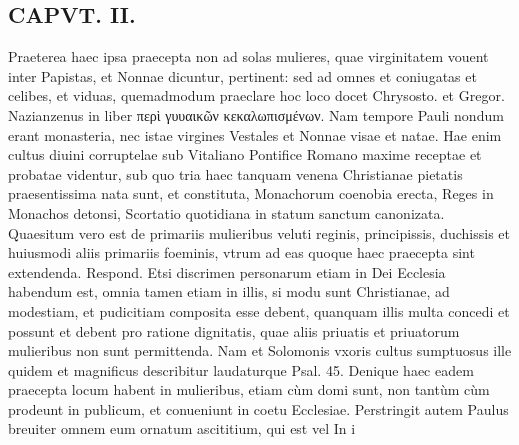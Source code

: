 \documentclass{article}
\begin{document}
\begin{pages}
\section*{CAPVT. II. }
\marginpar{[ p.79 ]}\pstart Praeterea haec ipsa praecepta non ad solas mulieres, quae virginitatem vouent inter Papistas, et Nonnae dicuntur, pertinent: sed ad omnes et coniugatas et celibes, et viduas, quemadmodum praeclare hoc loco docet Chrysosto. et Gregor. Nazianzenus in liber  περὶ γυυαικῶν κεκαλωπισμένων. Nam tempore Pauli nondum erant monasteria, nec istae virgines Vestales et Nonnae visae et natae. Hae enim cultus diuini corruptelae sub Vitaliano Pontifice Romano maxime receptae et probatae videntur, sub quo tria haec tanquam venena Christianae pietatis praesentissima nata sunt, et constituta, Monachorum coenobia erecta, Reges in Monachos detonsi, Scortatio quotidiana in statum sanctum canonizata.  \pend\pstart Quaesitum vero est de primariis mulieribus veluti reginis, principissis, duchissis et huiusmodi aliis primariis foeminis, vtrum ad eas quoque haec praecepta sint extendenda. Respond. Etsi discrimen personarum etiam in Dei Ecclesia habendum est, omnia tamen etiam in illis, si modu sunt Christianae, ad modestiam, et pudicitiam composita esse debent, quanquam illis multa concedi et possunt et debent pro ratione dignitatis, quae aliis priuatis et priuatorum mulieribus non sunt permittenda. Nam et Solomonis vxoris cultus sumptuosus ille quidem et magnificus describitur laudaturque Psal. 45.  \pend\pstart Denique haec eadem praecepta locum habent in mulieribus, etiam cùm domi sunt, non tantùm cùm prodeunt in publicum, et conueniunt in coetu Ecclesiae. Perstringit autem Paulus breuiter omnem eum ornatum ascititium, qui est vel In i\pend

\end{pages}
\end{document}
